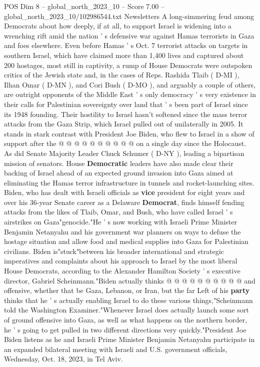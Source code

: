 \begin{textsample}{POS Dim 8 – global\_north\_2023\_10 – Score 7.00 – global\_north\_2023\_10/102986544.txt}  \label{ex:f8_pos_242}
Newsletters A long-simmering feud among Democrats about how deeply, if at all, to support Israel is widening into a wrenching rift amid the nation ' s defensive war against Hamas terrorists in Gaza and foes elsewhere.
Even before Hamas ' s Oct. 7 terrorist attacks on targets in southern Israel, which have claimed more than 1,400 lives and captured about 200 hostages, most still in captivity, a rump of House Democrats were outspoken critics of the Jewish state and, in the cases of Reps.
Rashida Tlaib ( D-MI ), Ilhan Omar ( D-MN ), and Cori Bush ( D-MO ), and arguably a couple of others, are outright opponents of the Middle East ' s only democracy ' s very existence in their calls for Palestinian sovereignty over land that ' s been part of Israel since its 1948 founding.
Their hostility to Israel hasn't softened since the mass terror attacks from the Gaza Strip, which Israel pulled out of unilaterally in 2005.
It stands in stark contrast with President Joe Biden, who flew to Israel in a show of support after the @ @ @ @ @ @ @ @ @ @ on a single day since the Holocaust.
As did Senate Majority Leader Chuck Schumer ( D-NY ), leading a bipartisan mission of senators.
House \textbf{Democratic} leaders have also made clear their backing of Israel ahead of an expected ground invasion into Gaza aimed at eliminating the Hamas terror infrastructure in tunnels and rocket-launching sites.
Biden, who has dealt with Israeli officials as \textbf{vice} president for eight years and over his 36-year Senate career as a Delaware \textbf{Democrat}, finds himself fending attacks from the likes of Tlaib, Omar, and Bush, who have called Israel ' s airstrikes on Gaza"genocide."He ' s now working with Israeli Prime Minister Benjamin Netanyahu and his government war planners on ways to defuse the hostage situation and allow food and medical supplies into Gaza for Palestinian civilians.
Biden is"stuck"between his broader international and strategic imperatives and complaints about his approach to Israel by the most liberal House Democrats, according to the Alexander Hamilton Society ' s executive director, Gabriel Scheinmann."Biden actually thinks @ @ @ @ @ @ @ @ @ @ and offensive, whether that be Gaza, Lebanon, or Iran, but the far Left of his \textbf{party} thinks that he ' s actually enabling Israel to do these various things,"Scheinmann told the Washington Examiner."Whenever Israel does actually launch some sort of ground offensive into Gaza, as well as what happens on the northern border, he ' s going to get pulled in two different directions very quickly."President Joe Biden listens as he and Israeli Prime Minister Benjamin Netanyahu participate in an expanded bilateral meeting with Israeli and U.S. government officials, Wednesday, Oct. 18, 2023, in Tel Aviv.

\end{textsample}
